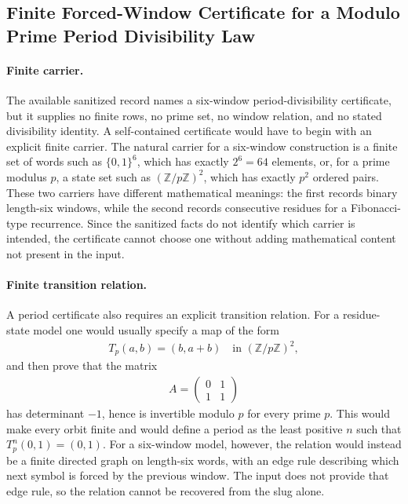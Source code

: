 \subsection{Finite Forced-Window Certificate for a Modulo Prime Period Divisibility Law}\label{sec:window6-pisano-period-modp-divisibility-law-certificate}

\paragraph{Finite carrier.}
The available sanitized record names a six-window period-divisibility certificate, but it supplies no finite rows, no prime set, no window relation, and no stated divisibility identity. A self-contained certificate would have to begin with an explicit finite carrier. The natural carrier for a six-window construction is a finite set of words such as $\{0,1\}^6$, which has exactly $2^6=64$ elements, or, for a prime modulus $p$, a state set such as $(\mathbb{Z}/p\mathbb{Z})^2$, which has exactly $p^2$ ordered pairs. These two carriers have different mathematical meanings: the first records binary length-six windows, while the second records consecutive residues for a Fibonacci-type recurrence. Since the sanitized facts do not identify which carrier is intended, the certificate cannot choose one without adding mathematical content not present in the input.

\paragraph{Finite transition relation.}
A period certificate also requires an explicit transition relation. For a residue-state model one would usually specify a map of the form
$$
\begin{aligned}
T_p(a,b)=(b,a+b)\quad \text{in }(\mathbb{Z}/p\mathbb{Z})^2,
\end{aligned}
$$
and then prove that the matrix
$$
\begin{aligned}
A=\begin{pmatrix}0&1\\1&1\end{pmatrix}
\end{aligned}
$$
has determinant $-1$, hence is invertible modulo $p$ for every prime $p$. This would make every orbit finite and would define a period as the least positive $n$ such that $T_p^n(0,1)=(0,1)$. For a six-window model, however, the relation would instead be a finite directed graph on length-six words, with an edge rule describing which next symbol is forced by the previous window. The input does not provide that edge rule, so the relation cannot be recovered from the slug alone.

